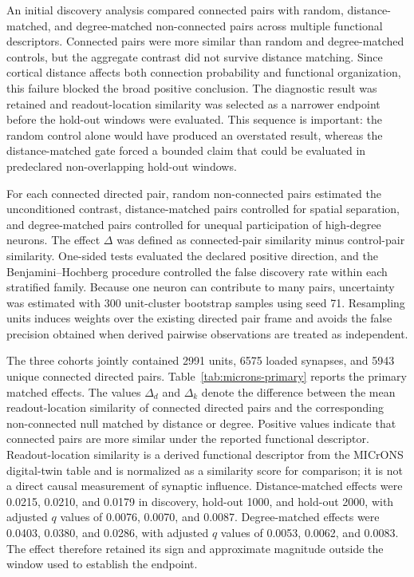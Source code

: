 An initial discovery analysis compared connected pairs with random,
distance-matched, and degree-matched non-connected pairs across multiple
functional descriptors. Connected pairs were more similar than random and
degree-matched controls, but the aggregate contrast did not survive distance
matching. Since cortical distance affects both connection probability and
functional organization, this failure blocked the broad positive conclusion.
The diagnostic result was retained and readout-location similarity was selected
as a narrower endpoint before the hold-out windows were evaluated. This sequence
is important: the random control alone would have produced an overstated result,
whereas the distance-matched gate forced a bounded claim that could be
evaluated in predeclared non-overlapping hold-out windows.

For each connected directed pair, random non-connected pairs estimated the
unconditioned contrast, distance-matched pairs controlled for spatial
separation, and degree-matched pairs controlled for unequal participation of
high-degree neurons. The effect $\Delta$ was defined as connected-pair
similarity minus control-pair similarity. One-sided tests evaluated the
declared positive direction, and the Benjamini--Hochberg procedure controlled
the false discovery rate within each stratified family. Because one neuron can
contribute to many pairs, uncertainty was estimated with 300 unit-cluster
bootstrap samples using seed 71. Resampling units induces weights over the existing directed pair frame and
avoids the false precision obtained when derived pairwise observations are
treated as independent.

The three cohorts jointly contained 2991 units, 6575 loaded synapses, and 5943
unique connected directed pairs. Table~\ref{tab:microns-primary} reports the
primary matched effects. The values $\Delta_d$ and $\Delta_k$ denote the
difference between the mean readout-location similarity of connected directed
pairs and the corresponding non-connected null matched by distance or degree.
Positive values indicate that connected pairs are more similar under the
reported functional descriptor. Readout-location similarity is a derived
functional descriptor from the MICrONS digital-twin table and is normalized as
a similarity score for comparison; it is not a direct causal measurement of
synaptic influence. Distance-matched effects were 0.0215, 0.0210, and 0.0179
in discovery, hold-out 1000, and hold-out 2000, with adjusted $q$ values of
0.0076, 0.0070, and 0.0087. Degree-matched effects were 0.0403, 0.0380, and
0.0286, with adjusted $q$ values of 0.0053, 0.0062, and 0.0083. The effect
therefore retained its sign and approximate magnitude outside the window used
to establish the endpoint.

